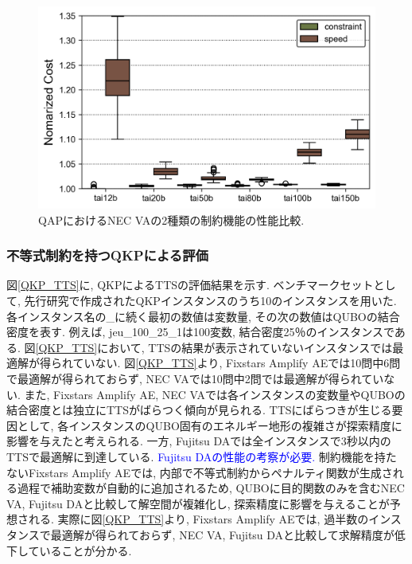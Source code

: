\documentclass[submit,techrep,noauthor]{ipsj}
\begin{document}
\begin{figure}[hb]
\centering
\includegraphics[bb=0 0 700 250, width=15cm]{speed_vs_constraint_QAP.png}
\caption{QAPにおけるNEC VAの2種類の制約機能の性能比較.}
\label{QAP_speed_vs_const}
\end{figure}

\subsubsection{不等式制約を持つQKPによる評価}

図\ref{QKP_TTS}に, QKPによるTTSの評価結果を示す. ベンチマークセットとして, 先行研究\cite{qkplib}で作成されたQKPインスタンスのうち10のインスタンスを用いた. 各インスタンス名の\_に続く最初の数値は変数量, その次の数値はQUBOの結合密度を表す. 例えば, jeu\_100\_25\_1は100変数, 結合密度25％のインスタンスである. 図\ref{QKP_TTS}において, TTSの結果が表示されていないインスタンスでは最適解が得られていない. 図\ref{QKP_TTS}より, Fixstars Amplify AEでは10問中6問で最適解が得られておらず, NEC VAでは10問中2問では最適解が得られていない. また, Fixstars Amplify AE, NEC VAでは各インスタンスの変数量やQUBOの結合密度とは独立にTTSがばらつく傾向が見られる. TTSにばらつきが生じる要因として, 各インスタンスのQUBO固有のエネルギー地形の複雑さが探索精度に影響を与えたと考えられる. 一方, Fujitsu DAでは全インスタンスで3秒以内のTTSで最適解に到達している. \textcolor{blue}{Fujitsu DAの性能の考察が必要.}
制約機能を持たないFixstars Amplify AEでは, 内部で不等式制約からペナルティ関数が生成される過程で補助変数が自動的に追加されるため, QUBOに目的関数のみを含むNEC VA, Fujitsu DAと比較して解空間が複雑化し, 探索精度に影響を与えることが予想される. 実際に図\ref{QKP_TTS}より, Fixstars Amplify AEでは, 過半数のインスタンスで最適解が得られておらず, NEC VA, Fujitsu DAと比較して求解精度が低下していることが分かる. 
\end{document}
